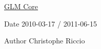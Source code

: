 \hyperlink{group__core}{G\+L\+M Core}

\begin{DoxyDate}{Date}
2010-\/03-\/17 / 2011-\/06-\/15 
\end{DoxyDate}
\begin{DoxyAuthor}{Author}
Christophe Riccio 
\end{DoxyAuthor}
